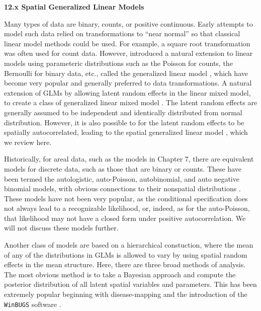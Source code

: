 \documentclass[12pt, titlepage]{article}
\begin{document}
\setcounter{equation}{0}
\renewcommand{\theequation}{12.\arabic{equation}}


%
%

{\Large \flushleft \textbf{12.x Spatial Generalized Linear Models}}

\vspace{.3cm}

Many types of data are binary, counts, or positive continuous.  Early attempts to model such data relied on transformations to ``near normal'' so that classical linear model methods could be used.  For example, a square root transformation was often used for count data.  However, \citet{NelderEtAl1972GeneralizedLinearModels370} introduced a natural extension to linear models using parameteric distributions such as the Poisson for counts, the Bernoulli for binary data, etc., called the generalized linear model \citep[GLM,][]{McCullaghEtAl1989GeneralizedLinearModels}, which have become very popular and generally preferred to data transformations.  A natural extension of GLMs by allowing latent random effects in the linear mixed model, to create a class of generalized linear mixed model \citep[GLMM,][]{breslow_approximate_1993}.  The latent random effects are generally assumed to be independent and identically distributed from normal distribution.  However, it is also possible to for the latent random effects to be spatially autocorrelated, leading to the spatial generalized linear model \citep[SGLM,][]{GotwayEtAl1997GeneralizedLinearModel157, DiggleEtAl1998ModelbasedGeostatisticsDisc299}, which we review here.

Historically, for areal data, such as the models in Chapter 7, there are equivalent models for discrete data, such as those that are binary or counts.  These have been termed the autologistic, auto-Poisson, autobinomial, and auto negative binomial models, with obvious connections to their nonspatial distributions \citep{Besag1974SpatialInteractionStatistical192, Cressie1993StatisticsSpatialData}.  These models have not been very popular, as the conditional specification does not always lead to a recognizable likelihood, or, indeed, as for the auto-Poisson, that likelihood may not have a closed form under positive autocorrelation.  We will not discuss these models further.

Another class of models are based on a hierarchical constuction, where the mean of any of the distributions in GLMs is allowed to vary by using spatial random effects in the mean structure.  Here, there are three broad methods of analysis.  The most obvious method is to take a Bayesian approach and compute the posterior distribution of all latent spatial variables and parameters.  This has been extremely popular beginning with disease-mapping \citep{clayton_empirical_1987} and the introduction of the \texttt{WinBUGS} software \citep{lunn_winbugs-bayesian_2000}. 
\end{document}
